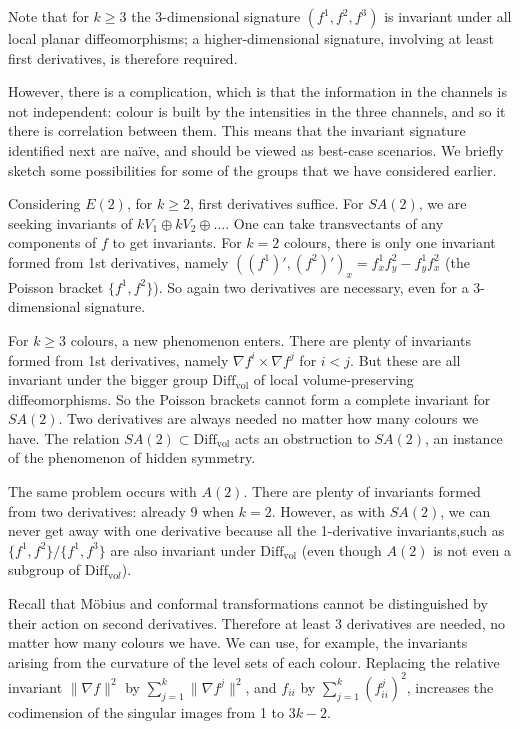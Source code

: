\documentclass[review,onefignum,onetabnum]{siamonline190516}
\begin{document}
Note that for $k\ge 3$ the 3-dimensional signature $(f^1,f^2,f^3)$ is invariant under all local planar diffeomorphisms; a higher-dimensional signature, involving at least first derivatives, is therefore required.

However, there is a complication, which is that the information in the channels is not independent: colour is built by the intensities in the three channels, and so it there is correlation between them. This means that the invariant signature identified next are na\"ive, and should be viewed as best-case scenarios. We briefly sketch some possibilities for some of the groups that we have considered earlier.

Considering $E(2)$, for $k\ge 2$, first derivatives suffice. 
For $SA(2)$,  we are seeking invariants of $k V_1 \oplus k V_2 \oplus \dots$. One can take transvectants of any components of $f$ to get invariants. For $k=2$ colours, there is only one  invariant formed from 1st derivatives, namely $((f^1)',(f^2)')_x = f^1_x f^2_y - f^1_y f^2_x$ (the Poisson bracket $\{f^1,f^2\}$). So again two derivatives are necessary, even for a 3-dimensional signature.

For $k\ge 3$ colours, a new phenomenon enters.  There are plenty of invariants formed from 1st derivatives, namely $\nabla f^i \times \nabla f^j$ for $i<j$. But these are all invariant under the bigger group $\mathrm{Diff}_{\mathrm{vol}}$ of local volume-preserving diffeomorphisms. So the Poisson brackets cannot form a complete invariant for $SA(2)$. Two derivatives are always needed no matter how many colours we have. The relation $SA(2)\subset \mathrm{Diff}_{\mathrm{vol}}$ acts an obstruction to $SA(2)$, an instance of the phenomenon of hidden symmetry.

The same problem occurs with $A(2)$. There are plenty of invariants formed from two derivatives: already 9 when $k=2$. However, as with $SA(2)$, we can never get away with one derivative because all the 1-derivative invariants,such as $\{f^1,f^2\}/\{f^1,f^3\}$ are also invariant under $\mathrm{Diff}_{\mathrm{vol}}$ (even though $A(2)$ is not even a subgroup of $\mathrm{Diff}_{\mathrm{vo}l}$).

Recall that M\"obius and conformal transformations cannot be distinguished by their action on second derivatives. Therefore at least 3 derivatives are needed, no matter how many colours we have. We can use, for example, the invariants arising from the curvature of the level sets of each colour. Replacing the relative invariant $\|\nabla f\|^2$ by $\sum_{j=1}^k \|\nabla f^j\|^2$, and $f_{ii}$ by $\sum_{j=1}^k (f^j_{ii})^2$, increases the codimension of the singular images from 1 to $3k-2$.
\end{document}
